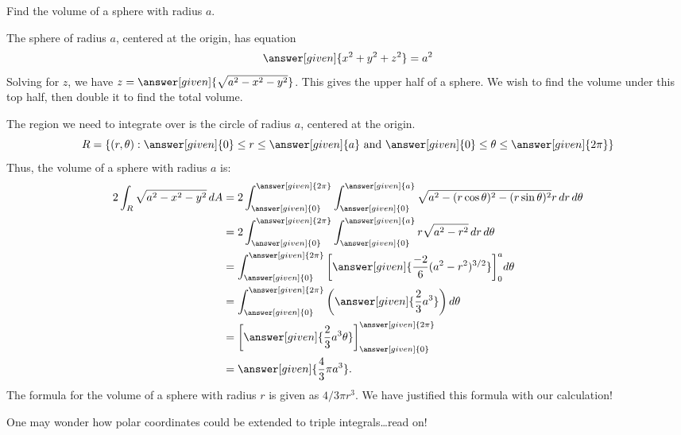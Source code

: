 \documentclass{ximera}
\begin{document}
\begin{example}
  Find the volume of a sphere with radius $a$.
  \begin{explanation}
    The sphere of radius $a$, centered at the origin, has equation
    \[
    \answer[given]{x^2+y^2+z^2}=a^2
    \]
    Solving for $z$, we have
    $z=\answer[given]{\sqrt{a^2-x^2-y^2}}$. This gives the upper half
    of a sphere. We wish to find the volume under this top half, then
    double it to find the total volume.

    The region we need to integrate over is the circle of radius $a$,
    centered at the origin.
    \[
    R =\{(r,\theta):\text{$\answer[given]{0}\leq r\leq \answer[given]{a}$ and  $\answer[given]{0}\leq\theta\leq\answer[given]{2\pi}$}\}
    \]
    Thus, the volume of a sphere with radius $a$ is:
    \begin{align*}
      2\int_R\sqrt{a^2-x^2-y^2}\d A &= 2\int_{\answer[given]{0}}^{\answer[given]{2\pi}}\int_{\answer[given]{0}}^{\answer[given]{a}}\sqrt{a^2-(r\cos\theta)^2-(r\sin\theta)^2}r\d r\d\theta\\
      &=2\int_{\answer[given]{0}}^{\answer[given]{2\pi}}\int_{\answer[given]{0}}^{\answer[given]{a}}r\sqrt{a^2-r^2}\d r\d\theta\\
      &=\int_{\answer[given]{0}}^{\answer[given]{2\pi}}\eval{\answer[given]{\frac{-2}{6}(a^2-r^2)^{3/2}}}_{0}^a d\theta\\
      &= \int_{\answer[given]{0}}^{\answer[given]{2\pi}}\left(\answer[given]{\frac{2}{3}a^3}\right)\d \theta\\
      &=\eval{\answer[given]{\frac{2}{3}a^3\theta}}_{\answer[given]{0}}^{\answer[given]{2\pi}}\\
      &=\answer[given]{\frac{4}{3}\pi a^3}.
    \end{align*}
    The formula for the volume of a sphere with radius $r$ is given as
    $4/3\pi r^3$.  We have justified this formula with our
    calculation!
  \end{explanation}
\end{example}

One may wonder how polar coordinates could be extended to triple integrals\dots read on!
\end{document}
